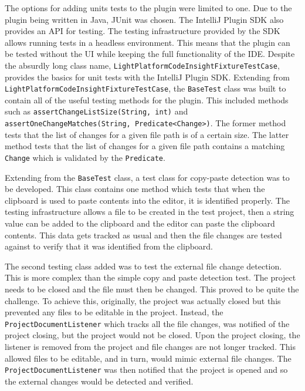 The options for adding units tests to the plugin were limited to one. Due to the plugin being written in Java, JUnit was chosen. The IntelliJ Plugin SDK also provides an API for testing. The testing infrastructure provided by the SDK allows running tests in a headless environment. This means that the plugin can be tested without the UI while keeping the full functionality of the IDE. Despite the absurdly long class name, \texttt{LightPlatformCodeInsightFixtureTestCase}, provides the basics for unit tests with the IntelliJ Plugin SDK. Extending from \texttt{LightPlatformCodeInsightFixtureTestCase}, the \texttt{BaseTest} class was built to contain all of the useful testing methods for the plugin. This included methods such as \texttt{assertChangeListSize(String, int)} and \texttt{assertOneChangeMatches(String, Predicate<Change>)}. The former method tests that the list of changes for a given file path is of a certain size. The latter method tests that the list of changes for a given file path contains a matching \texttt{Change} which is validated by the \texttt{Predicate}.

Extending from the \texttt{BaseTest} class, a test class for copy-paste detection was to be developed. This class contains one method which tests that when the clipboard is used to paste contents into the editor, it is identified properly. The testing infrastructure allows a file to be created in the test project, then a string value can be added to the clipboard and the editor can paste the clipboard contents. This data gets tracked as usual and then the file changes are tested against to verify that it was identified from the clipboard.

The second testing class added was to test the external file change detection. This is more complex than the simple copy and paste detection test. The project needs to be closed and the file must then be changed. This proved to be quite the challenge. To achieve this, originally, the project was actually closed but this prevented any files to be editable in the project. Instead, the \texttt{ProjectDocumentListener} which tracks all the file changes, was notified of the project closing, but the project would not be closed. Upon the project closing, the listener is removed from the project and file changes are not longer tracked. This allowed files to be editable, and in turn, would mimic external file changes. The \texttt{ProjectDocumentListener} was then notified that the project is opened and so the external changes would be detected and verified.

